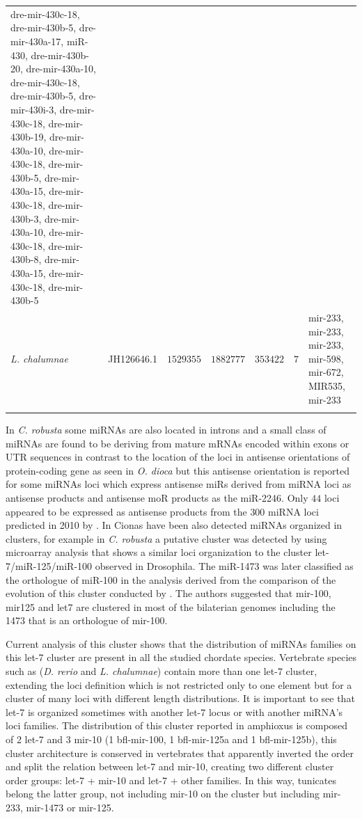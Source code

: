 \documentclass[graybox]{svmult}
\newcommand{\TODO}[1]{\begingroup\color{red}#1\endgroup}
\begin{document}
\begin{small}
\begin{center}
\begin{longtable}{p{2.0 cm}p{2 cm}p{2 cm}p{2 cm}p{1.2 cm}p{1.0 cm}p{2.6 cm}}
{dre-mir-430c-18, dre-mir-430b-5, dre-mir-430a-17, miR-430, dre-mir-430b-20, 
dre-mir-430a-10, dre-mir-430c-18, dre-mir-430b-5, dre-mir-430i-3, 
dre-mir-430c-18, dre-mir-430b-19, dre-mir-430a-10, dre-mir-430c-18, 
dre-mir-430b-5, dre-mir-430a-15, dre-mir-430c-18, dre-mir-430b-3, 
dre-mir-430a-10, dre-mir-430c-18, dre-mir-430b-8, dre-mir-430a-15, 
dre-mir-430c-18, dre-mir-430b-5} \\
\textit{L. chalumnae} & JH126646.1 & $1529355$ & $1882777$ & $353422$ & $7$ & 
mir-233, mir-233, mir-233, mir-598, mir-672, MIR535, mir-233 \\
\hline\noalign{\smallskip}
\end{longtable}
\end{center}
\end{small}

In \textit{C. robusta} some miRNAs are also located in introns and a small 
class of miRNAs are found to be deriving from mature mRNAs encoded within exons 
or UTR sequences \cite{Hendrix2010} \TODO{in contrast to the location of the  
loci in antisense orientations of protein-coding gene as seen in \textit{O. 
dioca} but this antisense orientation is reported for some miRNAs loci which 
express antisense miRs derived from miRNA loci as antisense products and 
antisense moR products as the miR-2246}. Only $44$ loci appeared to be 
expressed as antisense products from the $300$ miRNA loci predicted in 2010 by 
\cite{Hendrix2010}. In Cionas have been also detected miRNAs organized in 
clusters, for example in \textit{C. robusta} a putative cluster was detected by 
\cite{Keshavan2010} using microarray analysis that shows a similar loci 
organization to the cluster let-7/miR-125/miR-100 observed in Drosophila. The 
miR-1473 was later classified as the orthologue of miR-100 in the analysis 
derived from the comparison of the evolution of this cluster conducted by 
\cite{Griffiths-Jones2011}. The authors suggested that mir-100, mir125 and let7 
are clustered in most of the bilaterian genomes including the 1473 that is an 
orthologue of mir-100. 

Current analysis of this cluster shows that the distribution of miRNAs families 
on this let-7 cluster are present in all the studied chordate species. 
Vertebrate species such as (\textit{D. rerio} and \textit{L. chalumnae}) 
contain more than one let-7 cluster, extending the loci definition which is not 
restricted only to one element but for a cluster of many loci with different 
length distributions. It is important to see that let-7 is organized sometimes 
with another let-7 locus or with another miRNA's loci families. The 
distribution of this cluster reported in amphioxus is composed of 2 let-7 and 3 
mir-10 (1 bfl-mir-100, 1 bfl-mir-125a and 1 bfl-mir-125b), this 
cluster architecture is conserved in vertebrates that apparently inverted 
the order and split the relation between let-7 and mir-10, creating two 
different cluster order groups: let-7 + mir-10 and let-7 + other families. 
In this way, tunicates belong the latter group, not including mir-10 on the 
cluster but including mir-233, mir-1473 or mir-125. 
\end{document}
